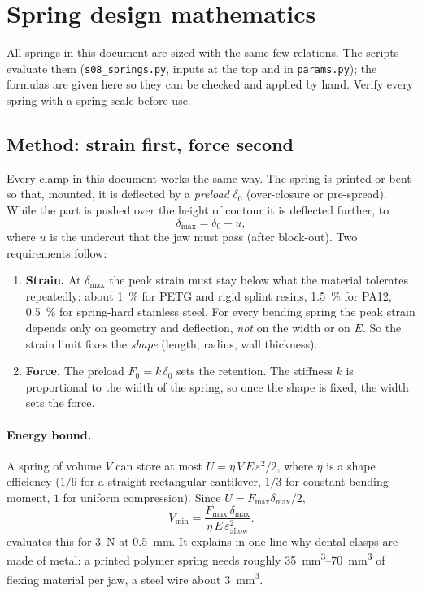 
\section{Spring design mathematics}\label{sec:springs}
All springs in this document are sized with the same few relations. The scripts evaluate them
(\texttt{s08\_springs.py}, inputs at the top and in \texttt{params.py}); the formulas are given here
so they can be checked and applied by hand. Verify every spring with a spring scale before use.

\subsection{Method: strain first, force second}\label{sec:method}
Every clamp in this document works the same way. The spring is printed or bent so that, mounted, it
is deflected by a \emph{preload} $\delta_0$ (over-closure or pre-spread). While the part is pushed
over the height of contour it is deflected further, to
\begin{equation}
\delta_\text{max} = \delta_0 + u ,
\end{equation}
where $u$ is the undercut that the jaw must pass (after block-out). Two requirements follow:
\begin{enumerate}
\item \textbf{Strain.} At $\delta_\text{max}$ the peak strain must stay below what the material
tolerates repeatedly: about \SI{1}{\percent} for PETG and rigid splint resins, \SI{1.5}{\percent}
for PA12, \SI{0.5}{\percent} for spring-hard stainless steel. For every bending spring the peak
strain depends only on geometry and deflection, \emph{not} on the width or on $E$. So the strain
limit fixes the \emph{shape} (length, radius, wall thickness).
\item \textbf{Force.} The preload $F_0=k\,\delta_0$ sets the retention. The stiffness $k$ is
proportional to the width of the spring, so once the shape is fixed, the width sets the force.
\end{enumerate}

\paragraph{Energy bound.} A spring of volume $V$ can store at most
$U=\eta\,V\,E\,\varepsilon^2/2$, where $\eta$ is a shape efficiency ($1/9$ for a straight
rectangular cantilever, $1/3$ for constant bending moment, $1$ for uniform compression). Since
$U = F_\text{max}\delta_\text{max}/2$,
\begin{equation}
V_\text{min} = \frac{F_\text{max}\,\delta_\text{max}}{\eta\,E\,\varepsilon_\text{allow}^2}.
\label{eq:energy}
\end{equation}
 evaluates this for \SI{3}{N} at \SI{0.5}{mm}. It explains in one line why dental
clasps are made of metal: a printed polymer spring needs roughly \SIrange{35}{70}{mm^3} of flexing
material per jaw, a steel wire about \SI{3}{mm^3}.

